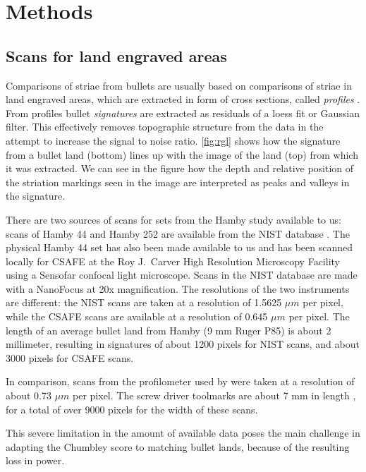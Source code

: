\documentclass[12pt]{article}
\begin{document}
\hypertarget{methods}{%
\section{Methods}\label{methods}}

\hypertarget{scans-for-land-engraved-areas}{%
\subsection{Scans for land engraved
areas}\label{scans-for-land-engraved-areas}}

Comparisons of striae from bullets are usually based on comparisons of
striae in land engraved areas, which are extracted in form of cross
sections, called \emph{profiles} \citep{aoas,ma2004}. From profiles
bullet \emph{signatures} \citep{chu2013,aoas} are extracted as residuals
of a loess fit or Gaussian filter. This effectively removes topographic
structure from the data in the attempt to increase the signal to noise
ratio. \autoref{fig:rgl} shows how the signature from a bullet land
(bottom) lines up with the image of the land (top) from which it was
extracted. We can see in the figure how the depth and relative position
of the striation markings seen in the image are interpreted as peaks and
valleys in the signature.

There are two sources of scans for sets from the Hamby study available
to us: scans of Hamby 44 and Hamby 252 are available from the NIST
database \citep{nist}. The physical Hamby 44 set has also been made
available to us and has been scanned locally for CSAFE at the Roy
J.~Carver High Resolution Microscopy Facility using a Sensofar confocal
light microscope. Scans in the NIST database are made with a NanoFocus
at 20x magnification. The resolutions of the two instruments are
different: the NIST scans are taken at a resolution of 1.5625 \(\mu m\)
per pixel, while the CSAFE scans are available at a resolution of 0.645
\(\mu m\) per pixel. The length of an average bullet land from Hamby (9
mm Ruger P85) is about 2 millimeter, resulting in signatures of about
1200 pixels for NIST scans, and about 3000 pixels for CSAFE scans.

In comparison, scans from the profilometer used by
\citet{chumbley, hadler} were taken at a resolution of about 0.73
\(\mu m\) per pixel. The screw driver toolmarks are about 7 mm in length
\citep{manytoolmarks1}, for a total of over 9000 pixels for the width of
these scans.

This severe limitation in the amount of available data poses the main
challenge in adapting the Chumbley score to matching bullet lands,
because of the resulting loss in power.
\end{document}
